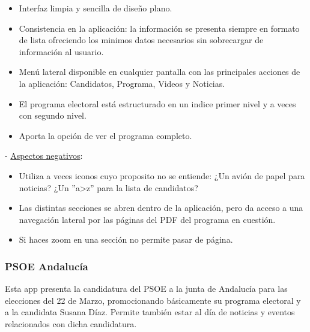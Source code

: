 \begin{itemize}
	\item Interfaz limpia y sencilla de diseño plano.
	\item Consistencia en la aplicación: la información se presenta siempre en formato de lista ofreciendo los minimos datos necesarios sin sobrecargar de información al usuario.
	\item Menú lateral disponible en cualquier pantalla con las principales acciones de la aplicación: Candidatos, Programa, Videos y Noticias.
	\item El programa electoral está estructurado en un indice primer nivel y a veces con segundo nivel.
	\item Aporta la opción de ver el programa completo. 
\end{itemize}

 - \underline{Aspectos negativos}:

\begin{itemize}
	\item Utiliza a veces iconos cuyo proposito no se entiende: ¿Un avión de papel para noticias? ¿Un ''a>z'' para la lista de candidatos?
	\item Las distintas secciones se abren dentro de la aplicación, pero da acceso a una navegación lateral por las páginas del PDF del programa en cuestión.
	\item Si haces zoom en una sección no permite pasar de página.
\end{itemize}

\subsubsection{PSOE Andalucía}

Esta app presenta la candidatura del PSOE a la junta de Andalucía para las elecciones del 22 de Marzo, promocionando básicamente su programa electoral y a la candidata Susana Díaz. Permite también estar al día de noticias y eventos relacionados con dicha candidatura.

